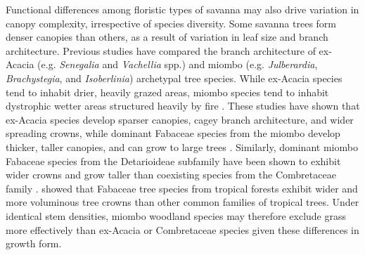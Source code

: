 \documentclass[11pt,a4paper]{article}
\begin{document}
Functional differences among floristic types of savanna may also drive variation in canopy complexity, irrespective of species diversity. Some savanna trees form denser canopies than others, as a result of variation in leaf size and branch architecture. Previous studies have compared the branch architecture of ex-Acacia (e.g. \textit{Senegalia} and \textit{Vachellia} spp.) and miombo (e.g. \textit{Julberardia}, \textit{Brachystegia}, and \textit{Isoberlinia}) archetypal tree species. While ex-Acacia species tend to inhabit drier, heavily grazed areas, miombo species tend to inhabit dystrophic wetter areas structured heavily by fire \citep{Ribeiro2020}. These studies have shown that ex-Acacia species develop sparser canopies, cagey branch architecture, and wider spreading crowns, while dominant Fabaceae species from the miombo develop thicker, taller canopies, and can grow to large trees \citep{Mugasha2013, Archibald2003, Privette2004}. Similarly, dominant miombo Fabaceae species from the Detarioideae subfamily have been shown to exhibit wider crowns and grow taller than coexisting species from the Combretaceae family \citep{}. \citet{Shenkin2020} showed that Fabaceae tree species from tropical forests exhibit wider and more voluminous tree crowns than other common families of tropical trees. Under identical stem densities, miombo woodland species may therefore exclude grass more effectively than ex-Acacia or Combretaceae species given these differences in growth form. 
\end{document}
